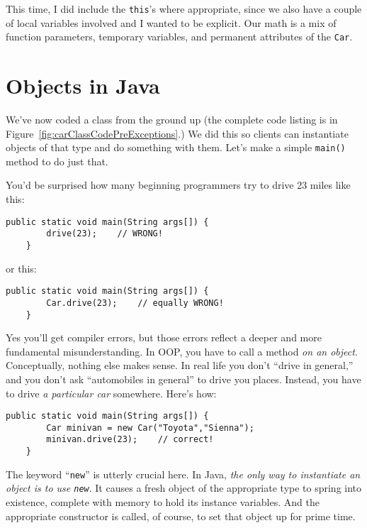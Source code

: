 This time, I did include the \texttt{this}'s where appropriate, since we also
have a couple of local variables involved and I wanted to be explicit. Our
math is a mix of function parameters, temporary variables, and permanent
attributes of the \texttt{Car}.


\section{Objects in Java}

We've now coded a class from the ground up (the complete code listing is in
Figure~\ref{fig:carClassCodePreExceptions}.) We did this so clients can
instantiate objects of that type and do something with them. Let's make a
simple \texttt{main()} method to do just that.

You'd be surprised how many beginning programmers try to drive 23 miles like
this:

\begin{Verbatim}[samepage=true,fontsize=\scriptsize,frame=single]
    public static void main(String args[]) {
        drive(23);    // WRONG!
    }
\end{Verbatim}

or this:

\begin{Verbatim}[samepage=true,fontsize=\scriptsize,frame=single]
    public static void main(String args[]) {
        Car.drive(23);    // equally WRONG!
    }
\end{Verbatim}

Yes you'll get compiler errors, but those errors reflect a deeper and more
fundamental misunderstanding. In OOP, you have to call a method \textit{on an
object}. Conceptually, nothing else makes sense. In real life you don't
``drive in general,'' and you don't ask ``automobiles in general'' to drive
you places. Instead, you have to drive \textit{a particular car} somewhere.
Here's how:

\begin{Verbatim}[samepage=true,fontsize=\scriptsize,frame=single]
    public static void main(String args[]) {
        Car minivan = new Car("Toyota","Sienna");
        minivan.drive(23);    // correct!
    }
\end{Verbatim}

The keyword ``\texttt{new}'' is utterly crucial here. In Java, \textit{the only
way to instantiate an object is to use \texttt{new}}. It causes a fresh object
of the appropriate type to spring into existence, complete with memory to hold
its instance variables. And the appropriate constructor is called, of course,
to set that object up for prime time.

